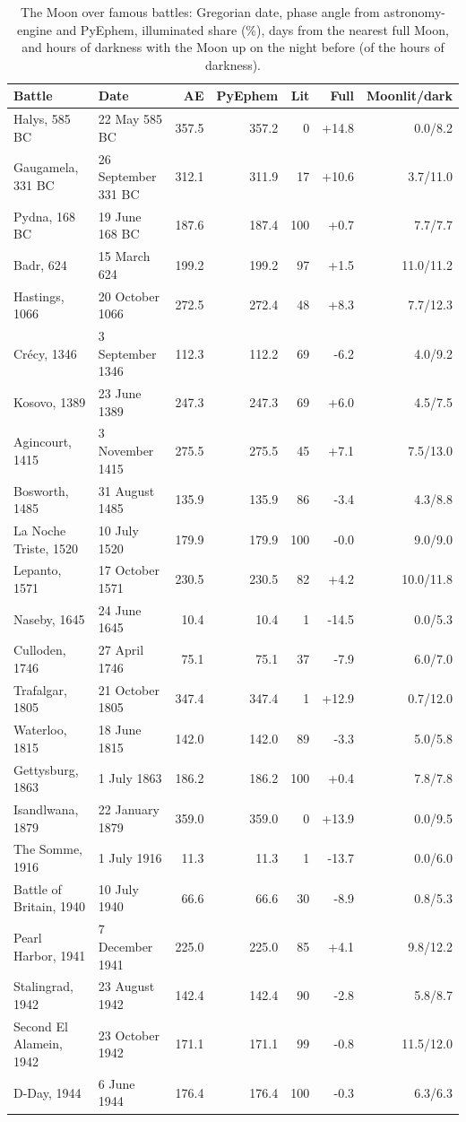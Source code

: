 \documentclass[11pt,a4paper]{article}
\begin{document}
\begin{table}[tbp]\centering\footnotesize\caption{The Moon over famous battles: Gregorian date, phase angle from astronomy-engine and PyEphem, illuminated share (\%), days from the nearest full Moon, and hours of darkness with the Moon up on the night before (of the hours of darkness).}\label{tab:famous}\begin{tabular}{llrrrrr}\toprule Battle & Date & AE & PyEphem & Lit & Full & Moonlit/dark\\\midrule
Halys, 585 BC & 22 May 585 BC & 357.5 & 357.2 & 0 & +14.8 & 0.0/8.2\\
Gaugamela, 331 BC & 26 September 331 BC & 312.1 & 311.9 & 17 & +10.6 & 3.7/11.0\\
Pydna, 168 BC & 19 June 168 BC & 187.6 & 187.4 & 100 & +0.7 & 7.7/7.7\\
Badr, 624 & 15 March 624 & 199.2 & 199.2 & 97 & +1.5 & 11.0/11.2\\
Hastings, 1066 & 20 October 1066 & 272.5 & 272.4 & 48 & +8.3 & 7.7/12.3\\
Crécy, 1346 & 3 September 1346 & 112.3 & 112.2 & 69 & -6.2 & 4.0/9.2\\
Kosovo, 1389 & 23 June 1389 & 247.3 & 247.3 & 69 & +6.0 & 4.5/7.5\\
Agincourt, 1415 & 3 November 1415 & 275.5 & 275.5 & 45 & +7.1 & 7.5/13.0\\
Bosworth, 1485 & 31 August 1485 & 135.9 & 135.9 & 86 & -3.4 & 4.3/8.8\\
La Noche Triste, 1520 & 10 July 1520 & 179.9 & 179.9 & 100 & -0.0 & 9.0/9.0\\
Lepanto, 1571 & 17 October 1571 & 230.5 & 230.5 & 82 & +4.2 & 10.0/11.8\\
Naseby, 1645 & 24 June 1645 & 10.4 & 10.4 & 1 & -14.5 & 0.0/5.3\\
Culloden, 1746 & 27 April 1746 & 75.1 & 75.1 & 37 & -7.9 & 6.0/7.0\\
Trafalgar, 1805 & 21 October 1805 & 347.4 & 347.4 & 1 & +12.9 & 0.7/12.0\\
Waterloo, 1815 & 18 June 1815 & 142.0 & 142.0 & 89 & -3.3 & 5.0/5.8\\
Gettysburg, 1863 & 1 July 1863 & 186.2 & 186.2 & 100 & +0.4 & 7.8/7.8\\
Isandlwana, 1879 & 22 January 1879 & 359.0 & 359.0 & 0 & +13.9 & 0.0/9.5\\
The Somme, 1916 & 1 July 1916 & 11.3 & 11.3 & 1 & -13.7 & 0.0/6.0\\
Battle of Britain, 1940 & 10 July 1940 & 66.6 & 66.6 & 30 & -8.9 & 0.8/5.3\\
Pearl Harbor, 1941 & 7 December 1941 & 225.0 & 225.0 & 85 & +4.1 & 9.8/12.2\\
Stalingrad, 1942 & 23 August 1942 & 142.4 & 142.4 & 90 & -2.8 & 5.8/8.7\\
Second El Alamein, 1942 & 23 October 1942 & 171.1 & 171.1 & 99 & -0.8 & 11.5/12.0\\
D-Day, 1944 & 6 June 1944 & 176.4 & 176.4 & 100 & -0.3 & 6.3/6.3\\
\bottomrule\end{tabular}\end{table}
\end{document}
